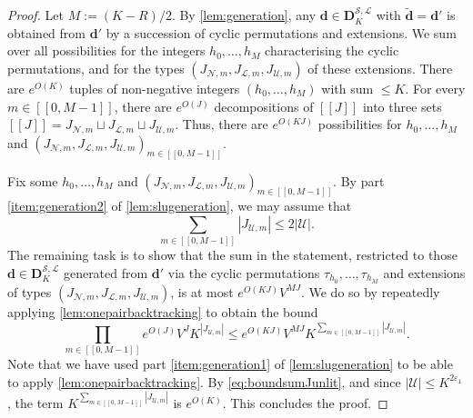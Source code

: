 \documentclass[11pt]{amsart}
\theoremstyle{definition}
\renewcommand{\leq}{\leqslant}
\newcommand{\interval}[2]{[\![#1,#2]\!] }
\newcommand{\sinterval}[1]{[\![#1]\!] }
\newcommand{\abs}[1]{\left|#1\right|}
\newcommand{\eps}{\varepsilon}
\renewcommand{\d}{\boldsymbol{d}}
\newcommand{\cstU}{2\eps_1}
\newcommand{\curlyL}{V}
\newcommand{\lit}{\mathcal{L}}
\newcommand{\unlit}{\mathcal{U}}
\newcommand{\s}{\mathcal{S}}
\newcommand{\new}{\mathcal{N}}
\newcommand{\fancyD}{\mathbf{D}}
\newcommand{\Dss}{\fancyD^{\s,\lit}_{\!\repK}}
\newcommand{\repR}{J}
\newcommand{\repK}{K}
\newcommand{\newR}{\sinterval{J}}
\newcommand{\Redd}{\widetilde{\d}}
\newcommand{\tupsize}{R}
\begin{document}
\begin{proof}
Let $M := (\repK - \tupsize)/2$. By \cref{lem:generation}, any $\d\in \Dss$ with $\Redd = \d'$ is obtained from $\d'$ by a succession of cyclic permutations and extensions. We sum over all possibilities for the integers $h_0, \ldots, h_M$ characterising the cyclic permutations, and for the types $(J_{\new,m}, J_{\lit,m}, J_{\unlit,m})$ of these extensions. There are $e^{O(\repK)}$ tuples of non-negative integers $(h_0, \ldots, h_M)$ with sum $\leq \repK$. For every $m\in \interval{0}{M-1}$, there are $e^{O(\repR)}$ decompositions of $\newR$ into three sets $\newR = J_{\new,m} \sqcup J_{\lit,m} \sqcup J_{\unlit,m}$. Thus, there are $e^{O(\repK\repR)}$ possibilities for $h_0, \ldots, h_M$ and $(J_{\new,m}, J_{\lit,m}, J_{\unlit,m})_{m\in \interval{0}{M-1}}$.

Fix some $h_0, \ldots, h_M$ and $(J_{\new,m}, J_{\lit,m}, J_{\unlit,m})_{m\in \interval{0}{M-1}}$. By part \cref{item:generation2} of \cref{lem:slugeneration}, we may assume that 
\begin{equation}
\label{eq:boundsumJunlit}
	\sum_{m\in \interval{0}{M-1}} \abs{J_{\unlit,m}} \leq 2\abs{\unlit}.
\end{equation}
The remaining task is to show that the sum in the statement, restricted to those $\d\in \Dss$ generated from $\d'$ via the cyclic permutations $\tau_{h_0}, \ldots, \tau_{h_M}$ and extensions of types $(J_{\new,m}, J_{\lit,m}, J_{\unlit,m})$, is at most $e^{O(\repK\repR)} \curlyL^{M\repR}$. 
We do so by repeatedly applying \cref{lem:onepairbacktracking} to obtain the bound
\begin{equation*}
	\prod_{m\in \interval{0}{M-1}} e^{O(\repR)} \curlyL^{\repR} \repK^{\abs{J_{\unlit,m}}} \leq e^{O(\repK\repR)} \curlyL^{M\repR} \repK^{\sum_{m\in \interval{0}{M-1}} \abs{J_{\unlit,m}}}.
\end{equation*}
Note that we have used part \cref{item:generation1} of \cref{lem:slugeneration} to be able to apply \cref{lem:onepairbacktracking}. By \cref{eq:boundsumJunlit}, and since $|\unlit| \leq\repK^{\cstU}$, the term $\repK^{\sum_{m\in \interval{0}{M-1}} \abs{J_{\unlit,m}}}$ is $e^{O(\repK)}$. This concludes the proof.
\end{proof}
\end{document}
